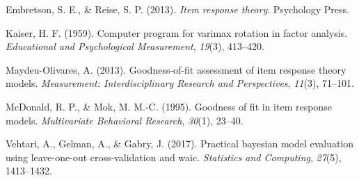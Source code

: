 \documentclass[10pt, letterpaper]{article}
\begin{document}
\leavevmode\hypertarget{ref-embretson2013item}{}%
Embretson, S. E., \& Reise, S. P. (2013). \emph{Item response theory}.
Psychology Press.

\leavevmode\hypertarget{ref-kaiser1959computer}{}%
Kaiser, H. F. (1959). Computer program for varimax rotation in factor
analysis. \emph{Educational and Psychological Measurement},
\emph{19}(3), 413--420.

\leavevmode\hypertarget{ref-maydeu2013goodness}{}%
Maydeu-Olivares, A. (2013). Goodness-of-fit assessment of item response
theory models. \emph{Measurement: Interdisciplinary Research and
Perspectives}, \emph{11}(3), 71--101.

\leavevmode\hypertarget{ref-mcdonald1995goodness}{}%
McDonald, R. P., \& Mok, M. M.-C. (1995). Goodness of fit in item
response models. \emph{Multivariate Behavioral Research}, \emph{30}(1),
23--40.

\leavevmode\hypertarget{ref-vehtari2017practical}{}%
Vehtari, A., Gelman, A., \& Gabry, J. (2017). Practical bayesian model
evaluation using leave-one-out cross-validation and waic.
\emph{Statistics and Computing}, \emph{27}(5), 1413--1432.


\end{document}
